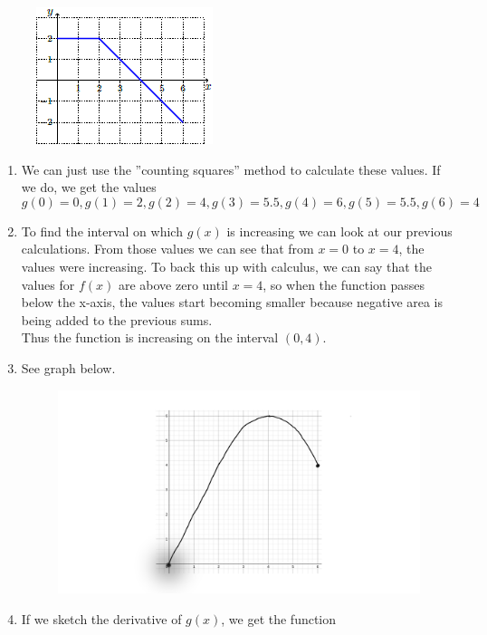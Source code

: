 \documentclass{article}
\begin{document}
\begin{enumerate}[label=\textbf{(2.\arabic*)}]
\begin{figure}[H]
\centering
\includegraphics{twopointtwo}
\end{figure}

\begin{enumerate}[label=(\alph*)]
\item We can just use the ''counting squares'' method to calculate these values. If we do, we get the values
\[g(0)=0, g(1)=2, g(2)=4, g(3)=5.5, g(4)=6, g(5)=5.5, g(6)=4\]
\item To find the interval on which $g(x)$ is increasing we can look at our previous calculations. From those values we can see that from $x=0$ to $x=4$, the values were increasing. To back this up with calculus, we can say that the values for $f(x)$ are above zero until $x=4$, so when the function passes below the x-axis, the values start becoming smaller because negative area is being added to the previous sums. \\
Thus the function is increasing on the interval $(0,4)$.
\item See graph below.

\begin{figure}[H]
\centering
\includegraphics[scale=.10]{twosies}
\end{figure}

\item If we sketch the derivative of $g(x)$, we get the function


\end{enumerate}
\end{enumerate}
\end{document}
